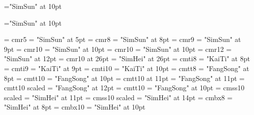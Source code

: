 %
\ifadobefont
  \def\song{Adobe Song Std}
  \def\hei{Adobe Heiti Std}
  \def\kai{Adobe Kaiti Std}
  \def\fang{Adobe Fangsong Std}
\else
  \def\song{SimSun}
  \def\hei{SimHei}
  \def\kai{KaiTi}
  \def\fang{FangSong}
\fi
%
\ifxecjk
  \font\CJKfont="\song" at 10pt
  
  \def\letfont{\let\CJKfont}
  \normalspacedchars{-}
\else
  \font\zhfont="\song" at 10pt
  \def\zhpunctfont{\zhfont}
  
  \zhspacing
  \def\letfont{\let\zhfont}
\fi
%
\font\enfiverm = cmr5
\font\zhfiverm = "\song" at 5pt
\def\fiverm{\enfiverm\letfont\zhfiverm}
\font\eneightrm = cmr8
\font\zheightrm = "\song" at 8pt
\def\eightrm{\eneightrm\letfont\zheightrm}
\font\enninerm = cmr9 %
\font\zhninerm = "\song" at 9pt
\def\ninerm{\enninerm\letfont\zhninerm}
\font\entenrm = cmr10 %
\font\zhtenrm = "\song"  at 10pt
\def\tenrm{\entenrm\letfont\zhtenrm}
\font\enoldtenrm = cmr10 %
\font\zholdtenrm = "\song"  at 10pt
\def\oldtenrm{\enoldtenrm\letfont\zholdtenrm}
\font\entwelverm = cmr12
\font\zhtwelverm = "\song"  at 12pt
\def\twelverm{\entwelverm\letfont\zhtwelverm}
\font\entwentysixrm = cmr10 at 26pt
\font\zhtwentysixrm = "\hei"  at 26pt
\def\twentysixrm{\entwentysixrm\letfont\zhtwentysixrm}
%
\font\eneightit = cmti8
\font\zheightit = "\kai" at 8pt
\def\eightit{\eneightit\letfont\zheightit}
\font\ennineit = cmti9
\font\zheightit = "\kai" at 9pt
\def\nineit{\ennineit\letfont\zhnineit}
\font\entenit = cmti10
\font\zhtenit = "\kai" at 10pt
\def\tenit{\entenit\letfont\zhtenit}
%
\font\eneighttt = cmtt8
\font\zheighttt = "\fang" at 8pt
\def\eighttt{\eneighttt\letfont\zheighttt}
\font\ententt = cmtt10
\font\zhtentt = "\fang" at 10pt
\def\tentt{\ententt\letfont\zhtentt}
\font\eneleventt = cmtt10 at 11pt
\font\zheleventt = "\fang" at 11pt
\def\elventt{\enelventt\letfont\zhelventt}
\font\entwelvett = cmtt10 scaled 
\font\zhtwelvett = "\fang" at 12pt
\def\twelvett{\entwelvett\letfont\zhtwelvett}
%
\font\entenbt = cmtt10
\font\zhtenbt = "\fang" at 10pt
\def\tenbt{\entenbt\letfont\zhtenbt}
%
\font\enelevensf = cmss10 scaled\magstephalf
\font\zhelevensf = "\hei" at 11pt
\def\elevensf{\enelevensf\letfont\zhelevensf}
\font\enfourteensf = cmss10 scaled
\font\zhfourteensf = "\hei" at 14pt
\def\fourteensf{\enfourteensf\letfont\zhfourteensf}
%
\font\eneightbf = cmbx8
\font\zheightbf = "\hei" at 8pt
\def\eightbf{\eneightbf\letfont\zheightbf}
\font\entenbf = cmbx10
\font\zhtenbf = "\hei" at 10pt
\def\tenbf{\entenbf\letfont\zhtenbf}

